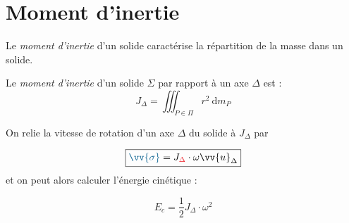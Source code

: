 \documentclass[11pt,a4paper,fleqn,pdftex]{report}
\begin{document}
\section{Moment d'inertie}
Le \emph{moment d'inertie} d'un solide caractérise la répartition de la masse dans un solide.
\begin{dfn}
  Le \emph{moment d'inertie} d'un solide $\Sigma$ par rapport à un axe $\Delta$ est :
  \begin{equation}
  J_\Delta = \iiint_{P\in \Pi} r^2 \: \mathrm{d}m_P
  \end{equation}
\end{dfn}
\begin{theorem}
On relie la vitesse de rotation d'un axe $\Delta$ du solide à $J_\Delta$ par\\ 
\begin{minipage}{6cm}
\begin{equation}\label{eq:J}
\boxed{\textcolor{MidnightBlue}{\vv{\sigma}}=J_{\textcolor{Red}{\Delta}}\cdot \omega\vv{u}_\Delta}
\end{equation}
%
et on peut alors calculer l'énergie cinétique : 
\end{minipage}
\begin{minipage}{5cm}
\vspace{10pt}
\end{minipage}
\begin{equation}
E_c=\frac{1}{2}J_\Delta\cdot\omega^2
\end{equation}
\end{theorem}
\end{document}
